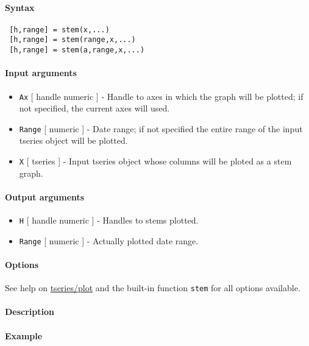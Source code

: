 


	\paragraph{Syntax}
 
 \begin{verbatim}
 [h,range] = stem(x,...)
 [h,range] = stem(range,x,...)
 [h,range] = stem(a,range,x,...)
 \end{verbatim}
 
 \paragraph{Input arguments}
 
 \begin{itemize}
 \item
   \texttt{Ax} {[} handle \textbar{} numeric {]} - Handle to axes in
   which the graph will be plotted; if not specified, the current axes
   will used.
 \item
   \texttt{Range} {[} numeric {]} - Date range; if not specified the
   entire range of the input tseries object will be plotted.
 \item
   \texttt{X} {[} tseries {]} - Input tseries object whose columns will
   be ploted as a stem graph.
 \end{itemize}
 
 \paragraph{Output arguments}
 
 \begin{itemize}
 \item
   \texttt{H} {[} handle \textbar{} numeric {]} - Handles to stems
   plotted.
 \item
   \texttt{Range} {[} numeric {]} - Actually plotted date range.
 \end{itemize}
 
 \paragraph{Options}
 
 See help on \url{tseries/plot} and the built-in function \texttt{stem}
 for all options available.
 
 \paragraph{Description}
 
 \paragraph{Example}


